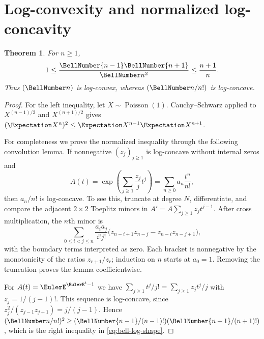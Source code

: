 \documentclass[11pt,a4paper,oneside,openany]{book}
\newtheorem{theorem}{Theorem}[chapter]
\theoremstyle{definition}
\theoremstyle{remark}
\begin{document}
\section{Log-convexity and normalized log-concavity}
\begin{theorem}\label{thm:bell-log-shape}
For $n\ge1$,
\begin{equation}\label{eq:bell-log-shape}
 1\le \frac{\BellNumber{n-1}\BellNumber{n+1}}{\BellNumber n^2}\le\frac{n+1}{n}.
\end{equation}
Thus $(\BellNumber n)$ is log-convex, whereas $(\BellNumber n/n!)$ is log-concave.
\end{theorem}
\begin{proof}
For the left inequality, let $X\sim\operatorname{Poisson}(1)$.  Cauchy--Schwarz
applied to $X^{(n-1)/2}$ and $X^{(n+1)/2}$ gives
$(\Expectation X^n)^2\le \Expectation X^{n-1}\Expectation X^{n+1}$.

For completeness we prove the normalized inequality through the following
convolution lemma.  If nonnegative $(z_j)_{j\ge1}$ is log-concave without internal
zeros and
\[
 A(t)=\exp\!\left(\sum_{j\ge1}\frac{z_j}{j}t^j\right)
      =\sum_{n\ge0}a_n\frac{t^n}{n!},
\]
then $a_n/n!$ is log-concave.  To see this, truncate at degree $N$, differentiate,
and compare the adjacent $2\times2$ Toeplitz minors in
$A'=A\sum_{j\ge1}z_jt^{j-1}$.  After cross multiplication, the $n$th minor is
\[
 \sum_{0\le i<j\le n}
 \frac{a_i a_j}{i!j!}
 \bigl(z_{n-i+1}z_{n-j}-z_{n-i}z_{n-j+1}\bigr),
\]
with the boundary terms interpreted as zero.  Each bracket is nonnegative by the
monotonicity of the ratios $z_{r+1}/z_r$; induction on $n$ starts at $a_0=1$.
Removing the truncation proves the lemma coefficientwise.

For $A(t)=\EulerE^{\EulerE^t-1}$ we have
$\sum_{j\ge1}t^j/j!=\sum_{j\ge1}z_jt^j/j$ with
$z_j=1/(j-1)!$.  This sequence is log-concave, since
$z_j^2/(z_{j-1}z_{j+1})=j/(j-1)$.  Hence
$(\BellNumber n/n!)^2\ge(\BellNumber{n-1}/(n-1)!)(\BellNumber{n+1}/(n+1)!)$, which is the right
inequality in \eqref{eq:bell-log-shape}.
\end{proof}
\end{document}

